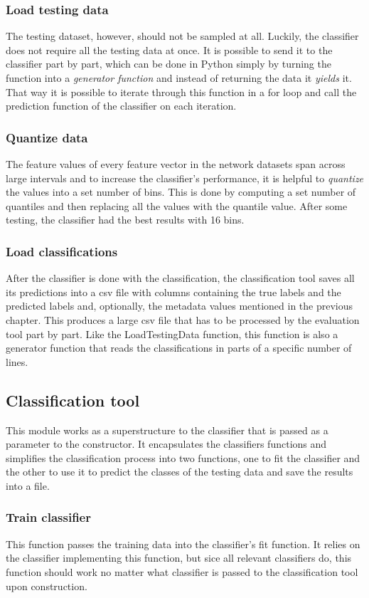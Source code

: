 \documentclass{article}
\begin{document}
      \subsubsection{Load testing data}
        The testing dataset, however, should not be sampled at all. Luckily, the classifier does not require all the testing data at once. It is possible to send it to the classifier part by part, which can be done in Python simply by turning the function into a {\it generator function} and instead of returning the data it {\it yields} it. That way it is possible to iterate through this function in a for loop and call the prediction function of the classifier on each iteration.
      \subsubsection{Quantize data}
        The feature values of every feature vector in the network datasets span across large intervals and to increase the classifier's performance, it is helpful to {\it quantize} the values into a set number of bins. This is done by computing a set number of quantiles and then replacing all the values with the quantile value. After some testing, the classifier had the best results with 16 bins. 
      \subsubsection{Load classifications}
        After the classifier is done with the classification, the classification tool saves all its predictions into a csv file with columns containing the true labels and the predicted labels and, optionally, the metadata values mentioned in the previous chapter. This produces a large csv file that has to be processed by the evaluation tool part by part. Like the LoadTestingData function, this function is also a generator function that reads the classifications in parts of a specific number of lines.
    \newpage
    \subsection{Classification tool}
      This module works as a superstructure to the classifier that is passed as a parameter to the constructor. It encapsulates the classifiers functions and simplifies the classification process into two functions, one to fit the classifier and the other to use it to predict the classes of the testing data and save the results into a file.
      \subsubsection{Train classifier}
        This function passes the training data into the classifier's fit function. It relies on the classifier implementing this function, but sice all relevant classifiers do, this function should work no matter what classifier is passed to the classification tool upon construction.
\end{document}
